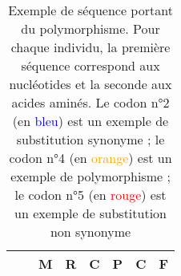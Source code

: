 \documentclass[../main]{subfiles} %
\begin{document}
\begin{table}[]
\begin{tabular}{cccccccc}
                                            &                               & M    & \textbf{R}    & C    & \textbf{P}    & \textbf{C}   & F   \\
        \bottomrule
    \end{tabular}
    \caption{Exemple de séquence portant du polymorphisme. Pour chaque individu, la première séquence correspond aux \glspl{nucléotide} et la seconde aux acides aminés. Le \gls{codon} n°2 (en \textcolor{blue}{bleu}) est un exemple de \gls{substitution} \gls{synonyme} ; le \gls{codon} n°4 (en \textcolor{orange}{orange}) est un exemple de \gls{polymorphisme} ; le \gls{codon} n°5 (en \textcolor{red}{rouge}) est un exemple de \gls{substitution} non \gls{synonyme}
    }
    \label{tab:seqEx}
\end{table}


\end{document}
